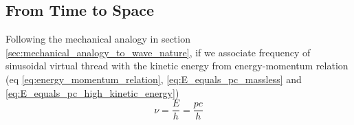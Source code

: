 \documentclass[11pt, a4paper]{article}
\newcommand{\eqrefnp}[1]{\textup{\ref{#1}}}
\begin{document}
\begin{enumerate}
\end{enumerate}

\subsection{From Time to Space}
Following the mechanical analogy in section \ref{sec:mechanical_analogy_to_wave_nature}, if we associate frequency of sinusoidal virtual thread with the kinetic energy from energy-momentum relation (eq \eqrefnp{eq:energy_momentum_relation}, \eqrefnp{eq:E_equals_pc_massless} and \eqrefnp{eq:E_equals_pc_high_kinetic_energy})
\begin{equation*}
	\nu = \frac{E}{h} = \frac{pc}{h}
\end{equation*}
\end{document}
